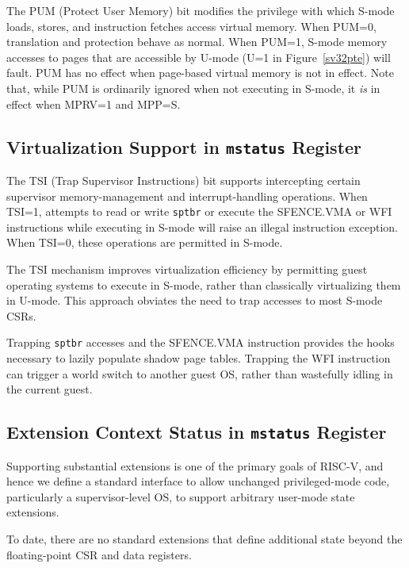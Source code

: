 The PUM (Protect User Memory) bit modifies the privilege with which S-mode
loads, stores, and instruction fetches access virtual memory.  When PUM=0,
translation and protection behave as normal.  When PUM=1, S-mode memory
accesses to pages that are accessible by U-mode (U=1 in Figure~\ref{sv32pte})
will fault.  PUM has no effect when page-based virtual memory is not in
effect.  Note that, while PUM is ordinarily ignored when not executing in
S-mode, it {\em is} in effect when MPRV=1 and MPP=S.

\subsection{Virtualization Support in {\tt mstatus} Register}

The TSI (Trap Supervisor Instructions) bit supports intercepting certain
supervisor memory-management and interrupt-handling operations.  When TSI=1,
attempts to read or write {\tt sptbr} or execute the SFENCE.VMA or WFI
instructions while executing in S-mode will raise an illegal instruction
exception.  When TSI=0, these operations are permitted in S-mode.

\begin{commentary}
The TSI mechanism improves virtualization efficiency by permitting guest
operating systems to execute in S-mode, rather than classically virtualizing
them in U-mode.  This approach obviates the need to trap accesses to most
S-mode CSRs.

Trapping {\tt sptbr} accesses and the SFENCE.VMA instruction provides the
hooks necessary to lazily populate shadow page tables.  Trapping the WFI
instruction can trigger a world switch to another guest OS, rather than
wastefully idling in the current guest.
\end{commentary}

\subsection{Extension Context Status in {\tt mstatus} Register}

Supporting substantial extensions is one of the primary goals of
RISC-V, and hence we define a standard interface to allow unchanged
privileged-mode code, particularly a supervisor-level OS, to support
arbitrary user-mode state extensions.

\begin{commentary}
  To date, there are no standard extensions that define additional
  state beyond the floating-point CSR and data registers.
\end{commentary}

